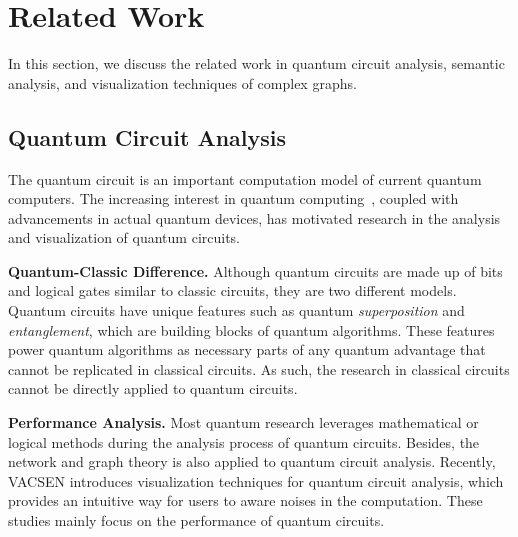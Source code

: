 \section{Related Work}
In this section, we discuss the related work in quantum circuit analysis, semantic analysis, and visualization techniques of complex graphs. 

\subsection{Quantum Circuit Analysis}

The quantum circuit is an important computation model of current quantum computers.
The increasing interest in quantum computing~\cite{Nielsen:2010:QCBook}, coupled with advancements in actual quantum devices\cite{Preskill:2018:NISQ}, has motivated research in the analysis and visualization of quantum circuits.

\textbf{Quantum-Classic Difference.}
Although quantum circuits are made up of bits and logical gates similar to classic circuits, they are two different models.
Quantum circuits have unique features such as quantum \emph{superposition} and \emph{entanglement}\cite{Jozsa:2003:REQ, Preskill:2012:QCEF}, which are building blocks of quantum algorithms.
These features power quantum algorithms as necessary parts of any quantum advantage that cannot be replicated in classical circuits.
As such, the research in classical circuits\cite{Kim:2010:EEV} cannot be directly applied to quantum circuits.

\textbf{Performance Analysis.}
Most quantum research leverages mathematical or logical methods during the analysis process of quantum circuits\cite{Maslov:2008:QCS, Bhattacharjee:2017:QCP, Tan:2020:OLS4QC, Weiden:2022:TAS}.
Besides, the network and graph theory is also applied to quantum circuit analysis\cite{Biamonte:2019:CNCQ, Iten:2022:EPPM}.
Recently, VACSEN\cite{Ruan:2023:VACSEN} introduces visualization techniques for quantum circuit analysis,
which provides an intuitive way for users to aware noises in the computation.
These studies mainly focus on the performance of quantum circuits.


